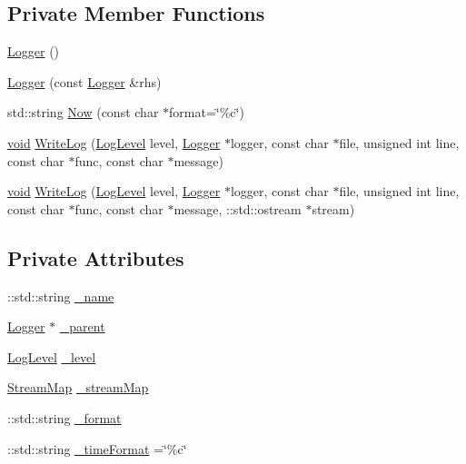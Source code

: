 \subsection*{Private Member Functions}
\begin{DoxyCompactItemize}
\item 
\mbox{\hyperlink{classeasylogger_1_1_logger_a8c5b5637694907e900012d300bf23033}{Logger}} ()
\item 
\mbox{\hyperlink{classeasylogger_1_1_logger_a9338a86dffe3f96185b22a179eb96ce4}{Logger}} (const \mbox{\hyperlink{classeasylogger_1_1_logger}{Logger}} \&rhs)
\item 
std\+::string \mbox{\hyperlink{classeasylogger_1_1_logger_abee0060678a306c347edf917c311dfce}{Now}} (const char $\ast$format=\char`\"{}\%c\char`\"{})
\item 
\mbox{\hyperlink{_thread_8h_af1e856da2e658414cb2456cb6f7ebc66}{void}} \mbox{\hyperlink{classeasylogger_1_1_logger_ac0e7b45cf7f2ce015fd4b510a76bd5b5}{Write\+Log}} (\mbox{\hyperlink{namespaceeasylogger_a68cb882ead21af982c40e3621fcd50b0}{Log\+Level}} level, \mbox{\hyperlink{classeasylogger_1_1_logger}{Logger}} $\ast$logger, const char $\ast$file, unsigned int line, const char $\ast$func, const char $\ast$message)
\item 
\mbox{\hyperlink{_thread_8h_af1e856da2e658414cb2456cb6f7ebc66}{void}} \mbox{\hyperlink{classeasylogger_1_1_logger_a2d09f2ce77a5eb571fb3436967651a12}{Write\+Log}} (\mbox{\hyperlink{namespaceeasylogger_a68cb882ead21af982c40e3621fcd50b0}{Log\+Level}} level, \mbox{\hyperlink{classeasylogger_1_1_logger}{Logger}} $\ast$logger, const char $\ast$file, unsigned int line, const char $\ast$func, const char $\ast$message, \+::std\+::ostream $\ast$stream)
\end{DoxyCompactItemize}
\subsection*{Private Attributes}
\begin{DoxyCompactItemize}
\item 
\+::std\+::string \mbox{\hyperlink{classeasylogger_1_1_logger_a3055e76f000f45c8db2b5390776bc131}{\+\_\+name}}
\item 
\mbox{\hyperlink{classeasylogger_1_1_logger}{Logger}} $\ast$ \mbox{\hyperlink{classeasylogger_1_1_logger_a83412985aecf3bc456c78a0b1425af85}{\+\_\+parent}}
\item 
\mbox{\hyperlink{namespaceeasylogger_a68cb882ead21af982c40e3621fcd50b0}{Log\+Level}} \mbox{\hyperlink{classeasylogger_1_1_logger_a123849db1e8dd97fa7e0eeedc4bcb747}{\+\_\+level}}
\item 
\mbox{\hyperlink{classeasylogger_1_1_logger_a27625e597ce11062ffd04fc8ca5154cd}{Stream\+Map}} \mbox{\hyperlink{classeasylogger_1_1_logger_a9290bed24c12786abef2c421158268f8}{\+\_\+stream\+Map}}
\item 
\+::std\+::string \mbox{\hyperlink{classeasylogger_1_1_logger_ab45891277952285a459ec39a03a91226}{\+\_\+format}}
\item 
\+::std\+::string \mbox{\hyperlink{classeasylogger_1_1_logger_a692cc5f57c16a7399d5630b1623bd613}{\+\_\+time\+Format}} =\char`\"{}\%c\char`\"{}
\end{DoxyCompactItemize}
